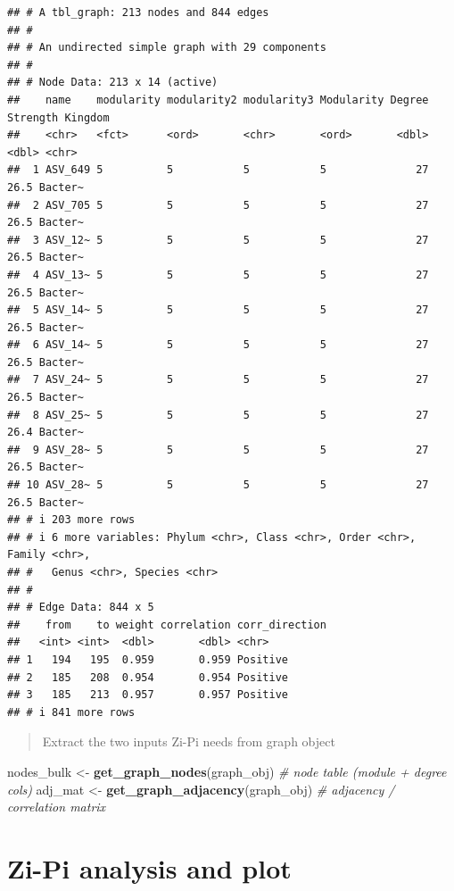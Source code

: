\documentclass[
]{book}
\newenvironment{Shaded}{\begin{snugshade}}{\end{snugshade}}
\newcommand{\CommentTok}[1]{\textcolor[rgb]{0.56,0.35,0.01}{\textit{#1}}}
\newcommand{\FunctionTok}[1]{\textcolor[rgb]{0.13,0.29,0.53}{\textbf{#1}}}
\newcommand{\NormalTok}[1]{#1}
\newcommand{\OtherTok}[1]{\textcolor[rgb]{0.56,0.35,0.01}{#1}}
\begin{document}
\begin{verbatim}
## # A tbl_graph: 213 nodes and 844 edges
## #
## # An undirected simple graph with 29 components
## #
## # Node Data: 213 x 14 (active)
##    name    modularity modularity2 modularity3 Modularity Degree Strength Kingdom
##    <chr>   <fct>      <ord>       <chr>       <ord>       <dbl>    <dbl> <chr>  
##  1 ASV_649 5          5           5           5              27     26.5 Bacter~
##  2 ASV_705 5          5           5           5              27     26.5 Bacter~
##  3 ASV_12~ 5          5           5           5              27     26.5 Bacter~
##  4 ASV_13~ 5          5           5           5              27     26.5 Bacter~
##  5 ASV_14~ 5          5           5           5              27     26.5 Bacter~
##  6 ASV_14~ 5          5           5           5              27     26.5 Bacter~
##  7 ASV_24~ 5          5           5           5              27     26.5 Bacter~
##  8 ASV_25~ 5          5           5           5              27     26.4 Bacter~
##  9 ASV_28~ 5          5           5           5              27     26.5 Bacter~
## 10 ASV_28~ 5          5           5           5              27     26.5 Bacter~
## # i 203 more rows
## # i 6 more variables: Phylum <chr>, Class <chr>, Order <chr>, Family <chr>,
## #   Genus <chr>, Species <chr>
## #
## # Edge Data: 844 x 5
##    from    to weight correlation corr_direction
##   <int> <int>  <dbl>       <dbl> <chr>         
## 1   194   195  0.959       0.959 Positive      
## 2   185   208  0.954       0.954 Positive      
## 3   185   213  0.957       0.957 Positive      
## # i 841 more rows
\end{verbatim}

\begin{quote}
Extract the two inputs Zi-Pi needs from graph object
\end{quote}

\begin{Shaded}
\begin{Highlighting}[]
\NormalTok{nodes\_bulk }\OtherTok{\textless{}{-}} \FunctionTok{get\_graph\_nodes}\NormalTok{(graph\_obj)      }\CommentTok{\# node table (module + degree cols)}
\NormalTok{adj\_mat    }\OtherTok{\textless{}{-}} \FunctionTok{get\_graph\_adjacency}\NormalTok{(graph\_obj)  }\CommentTok{\# adjacency / correlation matrix}
\end{Highlighting}
\end{Shaded}

\section{Zi-Pi analysis and plot}\label{zi-pi-analysis-and-plot}
\end{document}
